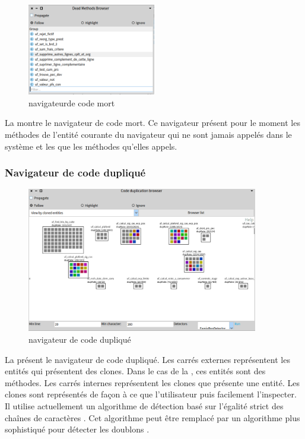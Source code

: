 \documentclass[a4paper]{article}
\begin{document}
\begin{figure}[htbp]
  \begin{center}
  \includegraphics[width=0.5\textwidth]{./figures/deadMethodBrowser.png}
  \caption{navigateurde code mort}
  \label{fig:deadMethodBrowser}
\end{center}
\vspace{-0.3cm}
\end{figure}
La  montre le navigateur de code mort.
Ce navigateur présent pour le moment les méthodes de l'entité courante du navigateur qui ne sont jamais appelés dans le système et les que les méthodes qu'elles appels.

\subsubsection{Navigateur de code dupliqué}
\begin{figure}[htbp]
  \begin{center}
  \includegraphics[width=0.9\textwidth]{./figures/duplicationBrowser.png}
  \caption{navigateur de code dupliqué}
  \label{fig:duplicationBrowser}
\end{center}
\vspace{-0.3cm}
\end{figure}
La  présent le navigateur de code dupliqué. Les carrés externes représentent les entités qui présentent des clones.
Dans le cas de la , ces entités sont des  méthodes. 
Les carrés internes représentent les clones que présente une entité.
Les clones sont représentés de façon à ce que l'utilisateur puis facilement l'inspecter.
Il utilise actuellement un algorithme de détection basé sur l'égalité strict des chaînes de caractères \citep{Duca99b}. 
Cet algorithme peut être remplacé par un algorithme plus sophistiqué pour détecter les doublons \citep{Roy07a}. 
\end{document}
